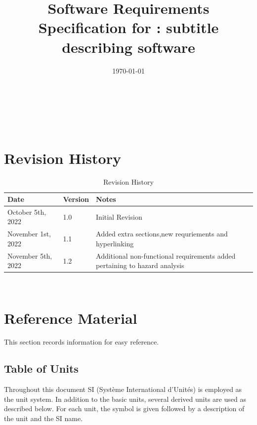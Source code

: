 \documentclass[12pt]{article}
\begin{document}
\title{Software Requirements Specification for \progname: subtitle describing software}
\author{\authname}
\date{\today}

\maketitle

~\newpage


\tableofcontents
\listoffigures
\listoftables
~\newpage

\section*{Revision History}

\begin{table}[H]
	\begin{tabularx}{\textwidth}{p{4cm}p{2cm}X}
	  \toprule {\bf Date} 		  & {\bf Version}	 & {\bf Notes} \\
	  \midrule
	  October 5th, 2022              & 1.0           		& Initial Revision       \\
	  November 1st, 2022		  & 1.1           		& Added extra sections,new requriements and hyperlinking\\   
	  November 5th, 2022           & 1.2                       & Additional non-functional requirements added pertaining to hazard analysis\\
	  \bottomrule
	\end{tabularx}
	\caption{\label{revHist}Revision History}
\end{table}
~\newpage
\pagebreak
\section{Reference Material}

This section records information for easy reference.

\subsection{Table of Units}

Throughout this document SI (Syst\`{e}me International d'Unit\'{e}s) is employed
as the unit system.  In addition to the basic units, several derived units are
used as described below.  For each unit, the symbol is given followed by a
description of the unit and the SI name.
~\newline
\end{document}
